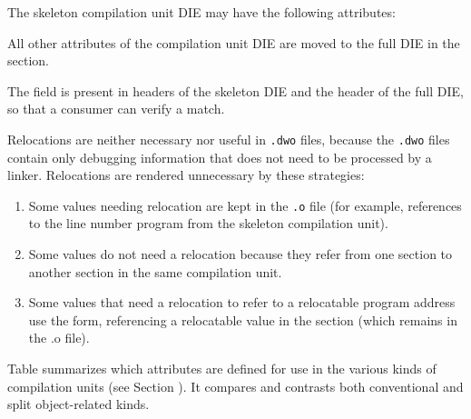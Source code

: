 The skeleton compilation unit DIE may have the following attributes:
\par
\begin{nolinenumbersenv}
\end{nolinenumbersenv}

All other attributes of the compilation unit DIE are moved to
the full DIE in the \dotdebuginfodwo{} section.

The \HFNdwoid{} field is present in headers of the skeleton DIE 
and the header of the full DIE, so that a consumer
can verify a match.

Relocations are neither necessary nor useful in 
\texttt{.dwo} files, because the \texttt{.dwo}  
files contain only debugging information that does not need to be
processed by a linker. Relocations are rendered unnecessary by 
these strategies:

\begin{enumerate}[1. ]
\item Some values needing relocation are kept in the \texttt{.o} file
(for example, references to the line number program from the skeleton
compilation unit).

\item Some values do not need a relocation because they refer from
one \dotdwo{} section to another \dotdwo{} section
in the same compilation unit. 

\item Some values that need a relocation to refer to a relocatable 
program address use the \DWFORMaddrx{} form, referencing a relocatable 
value in the \dotdebugaddr{} section (which remains in the .o file).

\end{enumerate}


Table  summarizes which
attributes are defined for use in the various 
kinds of compilation units (see Section ). 
It compares and contrasts both conventional and split object-related
kinds.

